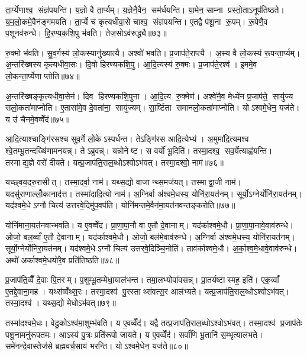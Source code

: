 ता॒र्प्येणाश्व॒ संज्ञ॑पयन्ति। य॒ज्ञो वै ता॒र्प्यम्। य॒ज्ञेनै॒वैन॒ सम॑र्धयन्ति। या॒मेन॒ साम्ना प्रस्तो॒ताऽनूप॑तिष्ठते। य॒म॒लो॒कमे॒वैन॑ङ्गमयति। ता॒र्प्ये च॑ कृत्यधीवा॒से चाश्व॒ संज्ञ॑पयन्ति। ए॒तद्वै प॑शू॒ना रू॒पम्। रू॒पेणै॒व प॒शूनव॑रुन्धे। हि॒र॒ण्य॒क॒शि॒पु भ॑वति। तेज॒सोऽव॑रुद्ध्यै॥७३॥

रु॒क्मो भ॑वति। सु॒व॒र्गस्य॑ लो॒कस्यानु॑ख्यात्यै। अश्वो॑ भवति। प्र॒जाप॑ते॒राप्त्यै। अ॒स्य वै लो॒कस्य॑ रू॒पन्ता॒र्प्यम्। अ॒न्तरि॑ख्षस्य कृत्यधीवा॒सः। दि॒वो हि॑रण्यकशि॒पु। आ॒दि॒त्यस्य॑ रु॒क्मः। प्र॒जाप॑ते॒रश्व॑। इ॒ममे॒व लो॒कन्ता॒र्प्येणाप्तोति॥७४॥

अ॒न्तरि॑ख्षङ्कृत्यधीवा॒सेन॑। दिव हिरण्यकशि॒पुना। आ॒दि॒त्य रु॒क्मेण॑। अश्वे॑नै॒व मेध्ये॑न प्र॒जाप॑ते॒ सायु॑ज्य सलो॒कता॑माप्नोति। ए॒तासा॑मे॒व दे॒वता॑ना॒ सायु॑ज्यम्। सा॒र्ष्टिता समानलो॒कता॑माप्नोति। योऽश्वमे॒धेन॒ यज॑ते। य उ॑ चैनमे॒वव्वेँद॑॥७५॥\anuvakamend[अव॑रुध्या आप्नोत्य॒ष्टौ च॑]

आ॒दि॒त्याश्चाङ्गि॑रसश्च सुव॒र्गे लो॒केऽस्पर्धन्त। तेऽङ्गि॑रस आदि॒त्येभ्य॑। अ॒मुमा॑दि॒त्यमश्व श्वे॒तम्भू॒तन्दख्षि॑णामनयन्न्। तेऽब्रुवन्न्। यन्नोनेष्ट। स वर्यो॑ भू॒दिति॑। तस्मा॒दश्व॒ सव॒र्येत्याह्व॑यन्ति। तस्माद्य॒ज्ञे वरो॑ दीयते। यत्प्र॒जाप॑ति॒राल॒ब्धोऽश्वोऽभ॑वत्। तस्मा॒दश्वो॒ नाम॑॥७६॥

यच्छ्वय॒दरु॒रासीत्। तस्मा॒दर्वा॒ नाम॑। यथ्स॒द्यो वाजान्थ्स॒मज॑यत्। तस्माद्वा॒जी नाम॑। यदसु॑राणाल्लोँ॒कानाद॑त्त। तस्मा॑दादि॒त्यो नाम॑। अ॒ग्निर्वा अ॑श्वमे॒धस्य॒ योनि॑रा॒यत॑नम्। सूर्यो॒ऽग्नेर्योनि॑रा॒यत॑नम्। यद॑श्वमे॒धेऽग्नौ चित्य॑ उत्तरवे॒दिमु॑प॒वप॑ति। योनि॑मन्तमे॒वैन॑मा॒यत॑नवन्तङ्करोति॥७७॥

योनि॑माना॒यत॑नवान्भवति। य ए॒वव्वेँद॑। प्रा॒णा॒पा॒नौ वा ए॒तौ दे॒वानाम्। यद॑र्काश्वमे॒धौ। प्रा॒णा॒पा॒नावे॒वाव॑रुन्धे। ओजो॒ बल॒व्वाँ ए॒तौ दे॒वानाम्। यद॑र्काश्वमे॒धौ। ओजो॒ बल॑मे॒वाव॑रुन्धे। अ॒ग्निर्वा अ॑श्वमे॒धस्य॒ योनि॑रा॒यत॑नम्। सूर्यो॒ग्नेर्योनि॑रा॒यत॑नम्। यद॑श्वमे॒धेऽग्नौ चित्य॑ उत्तरवे॒दिञ्चि॒नोति॑। ताव॑र्काश्वमे॒धौ। अ॒र्का॒श्व॒मे॒धावे॒वाव॑रुन्धे। अथो॑ अर्काश्वमे॒धयो॑रे॒व प्रति॑तिष्ठति॥७८॥\anuvakamend[नाम॑ करोति॒ सूर्यो॒ऽग्नेर्योनि॑रा॒यत॑नञ्च॒त्वारि॑ च]

प्र॒जाप॑ति॒व्वैँ दे॒वाः पि॒तरम्। प॒शुम्भू॒तम्मेधा॒याल॑भन्त। तमा॒लभ्योपा॑वसन्न्। प्रा॒तर्यष्टास्मह॒ इति॑। एक॒व्वाँ ए॒तद्दे॒वाना॒मह॑। यथ्स॑व्वँथ्स॒रः। तस्मा॒दश्व॑ पु॒रस्ताथ्संवत्स॒र आल॑भ्यते। यत्प्र॒जाप॑ति॒राल॒ब्धोऽश्वोऽभ॑वत्। तस्मा॒दश्व॑। यथ्स॒द्यो मेधोऽभ॑वत्॥७९॥

तस्मा॑दश्वमे॒धः। वेदु॒कोऽश्व॑मा॒शुम्भ॑वति। य ए॒वव्वेँद॑। यद्वै तत्प्र॒जाप॑ति॒राल॒ब्धोऽश्वोऽभ॑वत्। तस्मा॒दश्व॑ प्र॒जाप॑तेः पशू॒नामनु॑रूपतमः। आऽस्य॑ पु॒त्रः प्रति॑रूपो जायते। य ए॒वव्वेँद॑। सर्वा॑णि भू॒तानि॑ स॒म्भृत्याल॑भते। समे॑नन्दे॒वास्तेज॑से ब्रह्मवर्च॒साय॑ भरन्ति। योऽश्वमे॒धेन॒ यज॑ते॥८०॥


